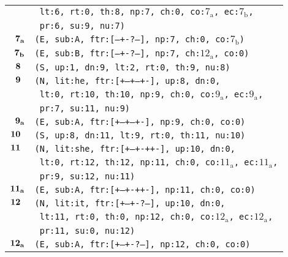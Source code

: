\documentclass{article}
\begin{document}
\begin{minipage}{\textwidth}
{\begin{tabular}{|r|l|}
    & \texttt{\texttt{~lt:6,~rt:0,~th:8,~np:7,~ch:0,~co:${\textrm{7}_{\textrm{a}}}$,~ec:${\textrm{7}_{\textrm{b}}}$,}} \\
    & \texttt{\texttt{~pr:6,~su:9,~nu:7)}} \\
    ${\textbf{\textrm{7}}_{\textbf{\textrm{a}}}}$ & \texttt{\texttt{(E,~sub:A,~ftr:[---+-?--],~np:7,~ch:0,~co:${\textrm{7}_{\textrm{b}}}$)}} \\
    ${\textbf{\textrm{7}}_{\textbf{\textrm{b}}}}$ & \texttt{\texttt{(E,~sub:B,~ftr:[---+-?--],~np:7,~ch:${\textrm{12}_{\textrm{a}}}$,~co:0)}} \\
    ${\textbf{\textrm{8}}_{\phantom{z}}}$ & \texttt{\texttt{(S,~up:1,~dn:9,~lt:2,~rt:0,~th:9,~nu:8)}} \\
    ${\textbf{\textrm{9}}_{\phantom{z}}}$ & \texttt{\texttt{(N,~lit:he,~ftr:[+--+--+-],~up:8,~dn:0,}} \\
    & \texttt{\texttt{~lt:0,~rt:10,~th:10,~np:9,~ch:0,~co:${\textrm{9}_{\textrm{a}}}$,~ec:${\textrm{9}_{\textrm{a}}}$,}} \\
    & \texttt{\texttt{~pr:7,~su:11,~nu:9)}} \\
    ${\textbf{\textrm{9}}_{\textbf{\textrm{a}}}}$ & \texttt{\texttt{(E,~sub:A,~ftr:[+--+--+-],~np:9,~ch:0,~co:0)}} \\
    ${\textbf{\textrm{10}}_{\phantom{z}}}$ & \texttt{\texttt{(S,~up:8,~dn:11,~lt:9,~rt:0,~th:11,~nu:10)}} \\
    ${\textbf{\textrm{11}}_{\phantom{z}}}$ & \texttt{\texttt{(N,~lit:she,~ftr:[+--+-++-],~up:10,~dn:0,}} \\
    & \texttt{\texttt{~lt:0,~rt:12,~th:12,~np:11,~ch:0,~co:${\textrm{11}_{\textrm{a}}}$,~ec:${\textrm{11}_{\textrm{a}}}$,}} \\
    & \texttt{\texttt{~pr:9,~su:12,~nu:11)}} \\
    ${\textbf{\textrm{11}}_{\textbf{\textrm{a}}}}$ & \texttt{\texttt{(E,~sub:A,~ftr:[+--+-++-],~np:11,~ch:0,~co:0)}} \\
    ${\textbf{\textrm{12}}_{\phantom{z}}}$ & \texttt{\texttt{(N,~lit:it,~ftr:[+--+-?--],~up:10,~dn:0,}} \\
    & \texttt{\texttt{~lt:11,~rt:0,~th:0,~np:12,~ch:0,~co:${\textrm{12}_{\textrm{a}}}$,~ec:${\textrm{12}_{\textrm{a}}}$,}} \\
    & \texttt{\texttt{~pr:11,~su:0,~nu:12)}} \\
    ${\textbf{\textrm{12}}_{\textbf{\textrm{a}}}}$ & \texttt{\texttt{(E,~sub:A,~ftr:[+--+-?--],~np:12,~ch:0,~co:0)}} \\
    \hline
  \end{tabular}
  }
\end{minipage}
\bigbreak
\end{document}
